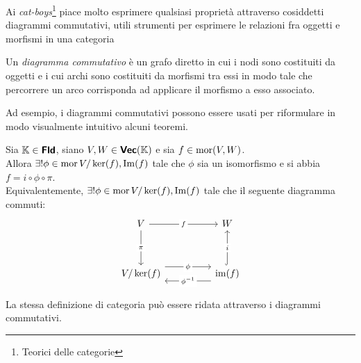 \documentclass{article}
\begin{document}
Ai \textit{cat-boys}\footnote{Teorici delle categorie} piace molto esprimere qualsiasi proprietà attraverso cosiddetti diagrammi commutativi, utili strumenti per esprimere le relazioni fra oggetti e morfismi in una categoria

\begin{definition}
    Un \emph{diagramma commutativo} è un grafo diretto in cui i nodi sono costituiti da oggetti e i cui archi sono costituiti da morfismi tra essi in modo tale che percorrere un arco corrisponda ad applicare il morfismo a esso associato. 
\end{definition}

Ad esempio, i diagrammi commutativi possono essere usati per riformulare in modo visualmente intuitivo alcuni teoremi.

\begin{theorem}
    Sia $\mathbb{K} \in \text{\sffamily\textbf{Fld}}$, siano $V,W \in \text{\sffamily\textbf{Vec}}(\mathbb{K})$ e sia $f \in \operatorname{mor}(V,W)$.\\
    Allora $\exists! \phi \in \operatorname{mor}{V/\ker(f), \operatorname{Im}(f)}$ tale che $\phi$ sia un isomorfismo e si abbia $f = i \circ \phi \circ \pi$.\\
    Equivalentemente, $\exists! \phi \in \operatorname{mor}{V/\ker(f), \operatorname{Im}(f)}$ tale che il seguente diagramma commuti:
    \[\begin{tikzcd}
        V && W \\
        \\
        {V/\ker(f)} && {\operatorname{im}(f)}
        \arrow["f"{description}, from=1-1, to=1-3]
        \arrow["\pi"{description}, from=1-1, to=3-1]
        \arrow["\phi"{description}, shift left=3, from=3-1, to=3-3]
        \arrow["i"{description}, hook, from=3-3, to=1-3]
        \arrow["{\phi^{-1}}"{description}, shift left=3, from=3-3, to=3-1]
    \end{tikzcd}\]
\end{theorem}

La stessa definizione di categoria può essere ridata attraverso i diagrammi commutativi.
\end{document}
